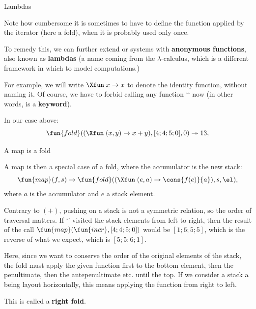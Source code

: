 %
\begin{frame}{Lambdas}

  Note how cumbersome it is sometimes to have to define the function
  applied by the iterator (here a fold), when it is probably used only
  once.

  \bigskip

  To remedy this, we can further extend or systems with
  \textbf{anonymous functions}, also known as \textbf{lambdas} (a
  name coming from the $\lambda$\hyp{}calculus, which is a different
  framework in which to model computations.)

  \bigskip

  For example, we will write $\Xfun\; x \rightarrow x$ to denote the
  identity function, without naming it. Of course, we have to forbid
  calling any function `` now (in other words, \Xfun is a
  \textbf{keyword}).

  \bigskip

  In our case above:
  \begin{equation*}
    \fun{fold} ((\Xfun\; (x,y) \rightarrow x + y), [4; 4; 5; 0], 0)
    \twoheadrightarrow 13,
  \end{equation*}

\end{frame}

%
\begin{frame}{A map is a fold}

  A map is then a special case of a fold, where the accumulator is the
  new stack:
  \begin{equation*}
    \fun{map}(f, s)
    \rightarrow \fun{fold}((\Xfun\; (e, a) \rightarrow \cons{f(e)}{a}), s, \el),
  \end{equation*}
  where $a$ is the accumulator and $e$ a stack element.

  \bigskip

  Contrary to $(+)$, pushing on a stack is not a symmetric relation,
  so the order of traversal matters.  If `' visited the
  stack elements from left to right, then the result of the call
  $\fun{map}(\fun{incr}, [4; 4; 5; 0])$ would be $[1;6;5;5]$, which is
  the reverse of what we expect, which is $[5;5;6;1]$.

  \bigskip

  Here, since we want to conserve the order of the original elements
  of the stack, the fold must apply the given function first to the
  bottom element, then the penultimate, then the antepenultimate
  etc. until the top. If we consider a stack a being layout
  horizontally, this means applying the function from right to left.

  \bigskip

  This is called a \textbf{right fold}.

\end{frame}

